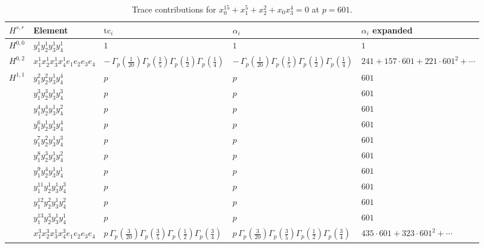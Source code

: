 \documentclass[11pt]{article}
\begin{document}
\begin{table}[ht]
\centering
\caption{Trace contributions for $x_0^{15} + x_1^{5} + x_2^{2} + x_0 x_3^{4} = 0$ at $p=601$.}\label{tab:deformed-74}
\renewcommand{\arraystretch}{1.1}
{\scriptsize
\begin{tabular}{@{}lllll@{}}
\toprule
$H^{s,r}$ & Element & $\mathrm{tc}_i$ & $\alpha_i$ & $\alpha_i$ expanded \\
\midrule
$H^{0,0}$ & $y_{1}^{1} y_{2}^{1} y_{3}^{1} y_{4}^{1}$ & $1$ & $1$ & $1$ \\
\midrule
$H^{0,2}$ & $x_{1}^{1} x_{2}^{1} x_{3}^{1} x_{4}^{1}  e_{1} e_{2} e_{3} e_{4}$ & $- \, \Gamma_p \left( \frac{1}{20} \right) \Gamma_p \left( \frac{1}{5} \right) \Gamma_p \left( \frac{1}{2} \right) \Gamma_p \left( \frac{1}{4} \right)$ & $- \, \Gamma_p \left( \frac{1}{20} \right) \Gamma_p \left( \frac{1}{5} \right) \Gamma_p \left( \frac{1}{2} \right) \Gamma_p \left( \frac{1}{4} \right)$ & $241{+}157{\cdot}601{+}221{\cdot}601^{2}{+}\cdots$ \\
\midrule
$H^{1,1}$ & $y_{1}^{2} y_{2}^{2} y_{3}^{1} y_{4}^{4}$ & $p \,$ & $p \,$ & $601$ \\
 & $y_{1}^{3} y_{2}^{3} y_{3}^{1} y_{4}^{3}$ & $p \,$ & $p \,$ & $601$ \\
 & $y_{1}^{4} y_{2}^{4} y_{3}^{1} y_{4}^{2}$ & $p \,$ & $p \,$ & $601$ \\
 & $y_{1}^{6} y_{2}^{1} y_{3}^{1} y_{4}^{4}$ & $p \,$ & $p \,$ & $601$ \\
 & $y_{1}^{7} y_{2}^{2} y_{3}^{1} y_{4}^{3}$ & $p \,$ & $p \,$ & $601$ \\
 & $y_{1}^{8} y_{2}^{3} y_{3}^{1} y_{4}^{2}$ & $p \,$ & $p \,$ & $601$ \\
 & $y_{1}^{9} y_{2}^{4} y_{3}^{1} y_{4}^{1}$ & $p \,$ & $p \,$ & $601$ \\
 & $y_{1}^{11} y_{2}^{1} y_{3}^{1} y_{4}^{3}$ & $p \,$ & $p \,$ & $601$ \\
 & $y_{1}^{12} y_{2}^{2} y_{3}^{1} y_{4}^{2}$ & $p \,$ & $p \,$ & $601$ \\
 & $y_{1}^{13} y_{2}^{3} y_{3}^{1} y_{4}^{1}$ & $p \,$ & $p \,$ & $601$ \\
 & $x_{1}^{3} x_{2}^{3} x_{3}^{1} x_{4}^{3}  e_{1} e_{2} e_{3} e_{4}$ & $p \, \Gamma_p \left( \frac{3}{20} \right) \Gamma_p \left( \frac{3}{5} \right) \Gamma_p \left( \frac{1}{2} \right) \Gamma_p \left( \frac{3}{4} \right)$ & $p \, \Gamma_p \left( \frac{3}{20} \right) \Gamma_p \left( \frac{3}{5} \right) \Gamma_p \left( \frac{1}{2} \right) \Gamma_p \left( \frac{3}{4} \right)$ & $435{\cdot}601{+}323{\cdot}601^{2}{+}\cdots$ \\

\end{tabular}}
\end{table}
\end{document}
